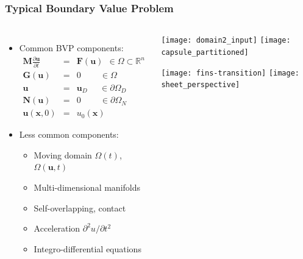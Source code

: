 \documentclass[mathserif]{beamer}
\newcommand{\bv}[1]{{\boldsymbol{#1}}}
\newcommand{\Reals}{\mathbb{R}}
\begin{document}
\begin{frame}[t]
  \frametitle{Typical Boundary Value Problem}
  \begin{columns}[t]
     \begin{itemize}
      \item Common BVP components:
      \vspace{-.1in}
        \begin{eqnarray}
	\label{eqn:general_pde}
	\nonumber
	\bv{M} \frac{\partial \bv{u}}{\partial t} & = & \bv{F}( \bv{u} ) \;\, \in \Omega \subset \Reals^n
        \\
	\nonumber
	\bv{G}( \bv{u} ) & = & 0 \;\;\;\;\;\;\;\; \in \Omega
	\\
	\nonumber
	\bv{u} & = & \bv{u}_D \;\;\;\;\; \in \partial \Omega_D
	\\
	\nonumber
	\bv{N}(\bv{u}) & = & 0 \;\;\;\;\;\;\;\; \in \partial \Omega_N
 	\\
 	\nonumber
 	\bv{u}(\bv{x}, 0) & = & u_0(\bv{x}) 
      \end{eqnarray}
      \item Less common components:
        \begin{itemize}
        \item Moving domain $\Omega(t)$, $\Omega(\bv{u},t)$
        \item Multi-dimensional manifolds
        \item Self-overlapping, contact
        \item Acceleration ${\partial^2 u}/{\partial t^2}$
        \item Integro-differential equations
        \end{itemize}
      \end{itemize}
      \begin{center}
	\texttt{[image: domain2\_input]}
	\texttt{[image: capsule\_partitioned]}

	\texttt{[image: fins-transition]} \;
	\texttt{[image: sheet\_perspective]}

      \end{center}
  \end{columns}
\end{frame}
\end{document}
